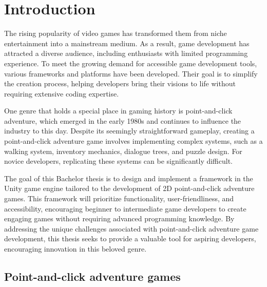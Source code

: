 \chapter{Introduction}
The rising popularity of video games has transformed them from niche entertainment into a mainstream medium. As a result, game development has attracted a diverse audience, including enthusiasts with limited programming experience. To meet the growing demand for accessible game development tools, various frameworks and platforms have been developed. Their goal is to simplify the creation process, helping developers bring their visions to life without requiring extensive coding expertise.

One genre that holds a special place in gaming history is point-and-click adventure, which emerged in the early 1980s and continues to influence the industry to this day. Despite its seemingly straightforward gameplay, creating a point-and-click adventure game involves implementing complex systems, such as a walking system, inventory mechanics, dialogue trees, and puzzle design. For novice developers, replicating these systems can be significantly difficult.

The goal of this Bachelor thesis is to design and implement a framework in the Unity game engine tailored to the development of 2D point-and-click adventure games. This framework will prioritize functionality, user-friendliness, and accessibility, encouraging beginner to intermediate game developers to create engaging games without requiring advanced programming knowledge. By addressing the unique challenges associated with point-and-click adventure game development, this thesis seeks to provide a valuable tool for aspiring developers, encouraging innovation in this beloved genre.

\section{Point-and-click adventure games}
